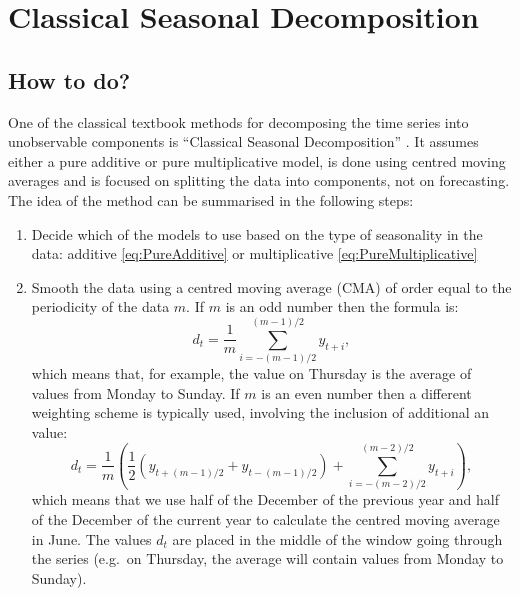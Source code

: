 \documentclass[]{book}
\providecommand{\tightlist}{%
  \setlength{\itemsep}{0pt}\setlength{\parskip}{0pt}}
\theoremstyle{definition}
\theoremstyle{definition}
\theoremstyle{definition}
\theoremstyle{definition}
\theoremstyle{remark}
\begin{document}
\hypertarget{ClassicalDecomposition}{%
\section{Classical Seasonal Decomposition}\label{ClassicalDecomposition}}

\hypertarget{how-to-do}{%
\subsection{How to do?}\label{how-to-do}}

One of the classical textbook methods for decomposing the time series into unobservable components is ``Classical Seasonal Decomposition'' \citep{Persons1919}. It assumes either a pure additive or pure multiplicative model, is done using centred moving averages and is focused on splitting the data into components, not on forecasting. The idea of the method can be summarised in the following steps:

\begin{enumerate}
\def\labelenumi{\arabic{enumi}.}
\tightlist
\item
  Decide which of the models to use based on the type of seasonality in the data: additive \eqref{eq:PureAdditive} or multiplicative \eqref{eq:PureMultiplicative}
\item
  Smooth the data using a centred moving average (CMA) of order equal to the periodicity of the data \(m\). If \(m\) is an odd number then the formula is:
  \begin{equation}
   d_t = \frac{1}{m}\sum_{i=-(m-1)/2}^{(m-1)/2} y_{t+i},
   \label{eq:CMAOdd}
  \end{equation}
  which means that, for example, the value on Thursday is the average of values from Monday to Sunday. If \(m\) is an even number then a different weighting scheme is typically used, involving the inclusion of additional an value:
  \begin{equation}
   d_t = \frac{1}{m}\left(\frac{1}{2}\left(y_{t+(m-1)/2}+y_{t-(m-1)/2}\right) + \sum_{i=-(m-2)/2}^{(m-2)/2} y_{t+i}\right),
   \label{eq:CMAEven}
  \end{equation}
  which means that we use half of the December of the previous year and half of the December of the current year to calculate the centred moving average in June. The values \(d_t\) are placed in the middle of the window going through the series (e.g.~on Thursday, the average will contain values from Monday to Sunday).
\end{enumerate}
\end{document}
